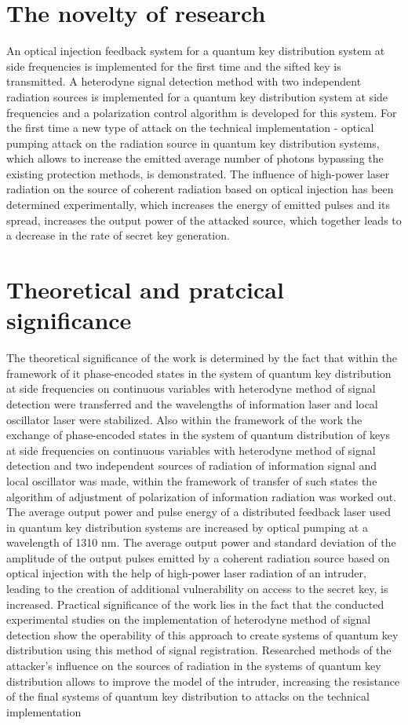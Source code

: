 \section*{The novelty of research}
An optical injection feedback system for a quantum key distribution system at side frequencies is implemented for the first time and the sifted key is transmitted. A heterodyne signal detection method with two independent radiation sources is implemented for a quantum key distribution system at side frequencies and a polarization control algorithm is developed for this system. For the first time a new type of attack on the technical implementation - optical pumping attack on the radiation source in quantum key distribution systems, which allows to increase the emitted average number of photons bypassing the existing protection methods, is demonstrated. The influence of high-power laser radiation on the source of coherent radiation based on optical injection has been determined experimentally, which increases the energy of emitted pulses and its spread, increases the output power of the attacked source, which together leads to a decrease in the rate of secret key generation.

\section*{Theoretical and pratcical significance}

The theoretical significance of the work is determined by the fact that within the framework of it phase-encoded states in the system of quantum key distribution at side frequencies on continuous variables with heterodyne method of signal detection were transferred and the wavelengths of information laser and local oscillator laser were stabilized. Also within the framework of the work the exchange of phase-encoded states in the system of quantum distribution of keys at side frequencies on continuous variables with heterodyne method of signal detection and two independent sources of radiation of information signal and local oscillator was made, within the framework of transfer of such states the algorithm of adjustment of polarization of information radiation was worked out. The average output power and pulse energy of a distributed feedback laser used in quantum key distribution systems are increased by optical pumping at a wavelength of 1310 nm. The average output power and standard deviation of the amplitude of the output pulses emitted by a coherent radiation source based on optical injection with the help of high-power laser radiation of an intruder, leading to the creation of additional vulnerability on access to the secret key, is increased. 
Practical significance of the work lies in the fact that the conducted experimental studies on the implementation of heterodyne method of signal detection show the operability of this approach to create systems of quantum key distribution using this method of signal registration. Researched methods of the attacker's influence on the sources of radiation in the systems of quantum key distribution allows to improve the model of the intruder, increasing the resistance of the final systems of quantum key distribution to attacks on the technical implementation

